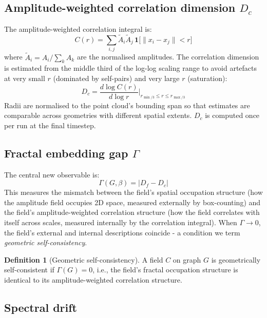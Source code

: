 \documentclass[12pt,a4paper]{article}
\theoremstyle{plain}
\theoremstyle{definition}
\newtheorem{definition}[theorem]{Definition}
\begin{document}
\subsection{Amplitude-weighted correlation dimension
            \texorpdfstring{$D_c$}{Dc}}

The amplitude-weighted correlation integral is:
\begin{equation}
C(r) = \sum_{i,j} \tilde{A}_i \tilde{A}_j\,
  \mathbf{1}\bigl[\|x_i - x_j\| < r\bigr]
\end{equation}
where $\tilde{A}_i = A_i / \sum_k A_k$ are the normalised amplitudes.
The correlation dimension is estimated from the middle third of the
log-log scaling range to avoid artefacts at very small $r$ (dominated
by self-pairs) and very large $r$ (saturation):
\begin{equation}
D_c = \frac{d\log C(r)}{d\log r}\bigg|_{r_{\min/3} \leq r \leq r_{\max/3}}
\end{equation}
Radii are normalised to the point cloud's bounding span so that estimates
are comparable across geometries with different spatial extents. $D_c$ is
computed once per run at the final timestep.

\subsection{Fractal embedding gap \texorpdfstring{$\Gamma$}{Gamma}}

The central new observable is:
\begin{equation}
\label{eq:gamma}
\Gamma(G,\beta) = |D_f - D_c|
\end{equation}
This measures the mismatch between the field's spatial occupation structure
(how the amplitude field occupies 2D space, measured externally by
box-counting) and the field's amplitude-weighted correlation structure
(how the field correlates with itself across scales, measured internally
by the correlation integral). When $\Gamma \to 0$, the field's external
and internal descriptions coincide - a condition we term \emph{geometric
self-consistency}.

\begin{definition}[Geometric self-consistency]
A field $C$ on graph $G$ is geometrically self-consistent if
$\Gamma(G) = 0$, i.e., the field's fractal occupation structure is
identical to its amplitude-weighted correlation structure.
\end{definition}

\subsection{Spectral drift}
\end{document}
